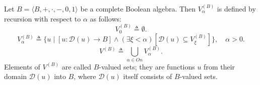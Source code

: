 Let $B = \langle B, +, \cdot, -, 0, 1 \rangle$ be a complete Boolean algebra. Then $V_{\alpha}^{(B)}$ is defined by recursion with respect to $\alpha$ as follows:
$$V_{0}^{(B)} \triangleq \emptyset.$$
$$V_{\alpha}^{(B)} \triangleq \{u \mid [u: \mathcal{D}(u) \rightarrow B] \wedge (\exists \xi < \alpha)[\mathcal{D}(u) \subseteq V_{\xi}^{(B)}]\}, \quad \alpha > 0.$$
$$V^{(B)} \triangleq \bigcup_{\alpha \in On} V_{\alpha}^{(B)}.$$
Elements of $V^{(B)}$ are called $B$-valued sets; they are functions $u$ from their domain $\mathcal{D}(u)$ into $B$, where $\mathcal{D}(u)$ itself consists of $B$-valued sets.
